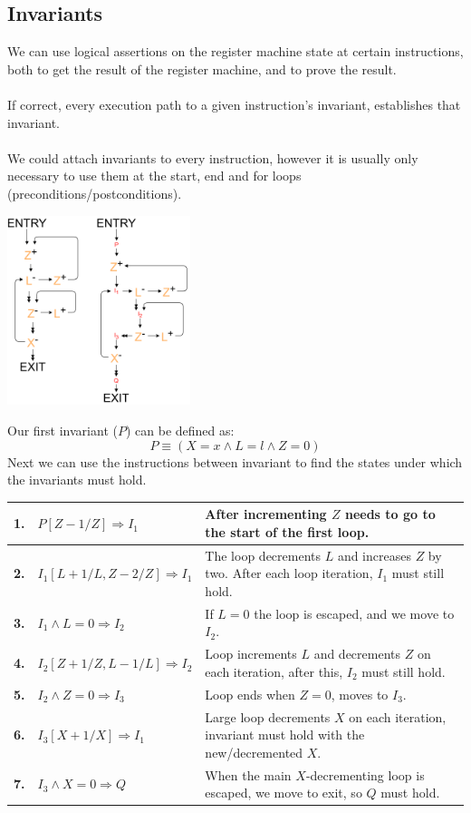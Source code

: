 \subsection{Invariants}
We can use logical assertions on the register machine state at certain instructions, both to get the result of the register machine, and to prove the result.
\\
\\ If correct, every execution path to a given instruction's invariant, establishes that invariant.
\\
\\ We could attach invariants to every instruction, however it is usually only necessary to use them at the start, end and for loops (preconditions/postconditions).
\begin{center}
	\includegraphics[width=0.4\textwidth]{register_machines/images/rm_analysis_invariants.drawio.png}
\end{center}
Our first invariant ($P$) can be defined as:
\[P \equiv (X =x  \land L = l \land Z = 0)\]
Next we can use the instructions between invariant to find the states under which the invariants must hold.
\begin{center}
	\begin{tabular}{l l p{}}
		\textbf{1.} & $P[Z-1/Z] \Rightarrow I_1$              & After incrementing $Z$ needs to go to the start of the first loop.                                  \\
		\hline
		\textbf{2.} & $I_1[L + 1/L, Z - 2/Z] \Rightarrow I_1$ & The loop decrements $L$ and increases $Z$ by two. After each loop iteration, $I_1$ must still hold. \\
		\hline
		\textbf{3.} & $I_1 \land L = 0 \Rightarrow I_2$       & If $L = 0$ the loop is escaped, and we move to $I_2$.                                               \\
		\hline
		\textbf{4.} & $I_2[Z+1/Z,L-1/L] \Rightarrow I_2$      & Loop increments $L$ and decrements $Z$ on each iteration, after this, $I_2$ must still hold.        \\
		\hline
		\textbf{5.} & $I_2 \land Z = 0 \Rightarrow I_3$       & Loop ends when $Z = 0$, moves to $I_3$.                                                             \\
		\hline
		\textbf{6.} & $I_3[X+1/X] \Rightarrow I_1$            & Large loop decrements $X$ on each iteration, invariant must hold with the new/decremented $X$.      \\
		\hline
		\textbf{7.} & $I_3 \land X = 0 \Rightarrow Q$         & When the main $X$-decrementing loop is escaped, we move to exit, so $Q$ must hold.
	\end{tabular}
\end{center}
